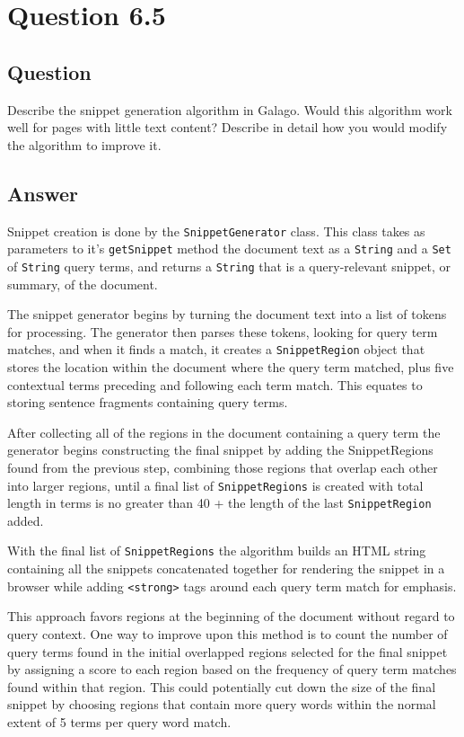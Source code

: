 \section{Question 6.5}

\subsection{Question}
Describe the snippet generation algorithm in Galago. Would this algorithm
work well for pages with little text content? Describe in detail how you would
modify the algorithm to improve it.


\subsection{Answer}
Snippet creation is done by the \texttt{SnippetGenerator} class.  This class takes as parameters to it's \texttt{getSnippet} method the document text as a \texttt{String} and a \texttt{Set} of \texttt{String} query terms, and returns a \texttt{String} that is a query-relevant snippet, or summary, of the document.

The snippet generator begins by turning the document text into a list of tokens for processing.  The generator then parses these tokens, looking for query term matches, and when it finds a match, it creates a \texttt{SnippetRegion} object that stores the location within the document where the query term matched, plus five contextual terms preceding and following each term match.  This equates to storing sentence fragments containing query terms.

After collecting all of the regions in the document containing a query term the generator begins constructing the final snippet by adding the SnippetRegions found from the previous step, combining those regions that overlap each other into larger regions, until a final list of \texttt{SnippetRegions} is created with total length in terms is no greater than 40 + the length of the last \texttt{SnippetRegion} added.

With the final list of \texttt{SnippetRegions} the algorithm builds an HTML string containing all the snippets concatenated together for rendering the snippet in a browser while adding \texttt{<strong>} tags around each query term match for emphasis.

This approach favors regions at the beginning of the document without regard to query context.  One way to improve upon this method is to count the number of query terms found in the initial overlapped regions selected for the final snippet by assigning a score to each region based on the frequency of query term matches found within that region.  This could potentially cut down the size of the final snippet by choosing regions that contain more query words within the normal extent of 5 terms per query word match. 